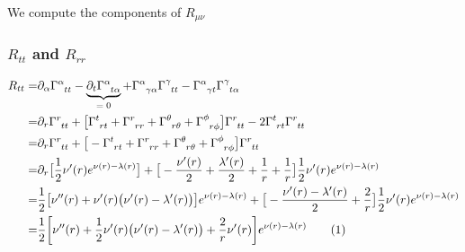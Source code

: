\documentclass[]{article}
\newcommand\numberthis{\addtocounter{equation}{1}\tag{\theequation}}
\begin{document}
We compute the components of $R_{\mu\nu}$

\subsubsection{$R_{tt}$ and $R_{rr}$}
\begin{align*}
	R_{tt} =& \partial_\alpha \Gamma\indices{^\alpha_{tt}} - \underbrace{\partial_t \Gamma\indices{^\alpha_{t\alpha}}}_\text{$=0$} + \Gamma\indices{^\alpha_{\gamma\alpha}} \Gamma\indices{^\gamma_{tt}} - \Gamma\indices{^\alpha_{\gamma t}} \Gamma\indices{^\gamma_{t\alpha}} \\
	=& \partial_r \Gamma\indices{^r_{tt}}  + \big[\Gamma\indices{^t_{rt}}+\Gamma\indices{^r_{rr}} + \Gamma\indices{^\theta_{r\theta}}+ \Gamma\indices{^\phi_{r\phi}}\big] \Gamma\indices{^r_{tt}} - 2\Gamma\indices{^t_{r t}} \Gamma\indices{^r_{tt}} \\
	=& \partial_r \Gamma\indices{^r_{tt}}  + \big[-\Gamma\indices{^t_{rt}}+\Gamma\indices{^r_{rr}} + \Gamma\indices{^\theta_{r\theta}}+ \Gamma\indices{^\phi_{r\phi}}\big] \Gamma\indices{^r_{tt}} \\
	=& \partial_r \big[\frac{1}{2} \nu^\prime(r) e^{\nu(r)-\lambda(r)}\big]  + \big[-\frac{\nu^\prime(r)}{2}+\frac{\lambda^\prime(r)}{2} + \frac{1}{r} + \frac{1}{r}\big] \frac{1}{2} \nu^\prime(r) e^{\nu(r)-\lambda(r)}  \\
	=& \frac{1}{2} \big[ \nu^{\prime\prime}(r) + \nu^\prime(r) \big(\nu^\prime(r)-\lambda^\prime(r)\big)\big] e^{\nu(r)-\lambda(r)}+ \big[-\frac{\nu^\prime(r)-\lambda^\prime(r)}{2} + \frac{2}{r}\big] \frac{1}{2} \nu^\prime(r) e^{\nu(r)-\lambda(r)} \\
	=& \frac{1}{2} \bigg[\nu^{\prime\prime}(r) + \frac{1}{2}\nu^\prime(r) \big(\nu^\prime(r)-\lambda^\prime(r)\big)+ \frac{2}{r}\nu^\prime(r)\bigg] e^{\nu(r)-\lambda(r)} \numberthis \label{eq:Rtt}
\end{align*}
\end{document}
